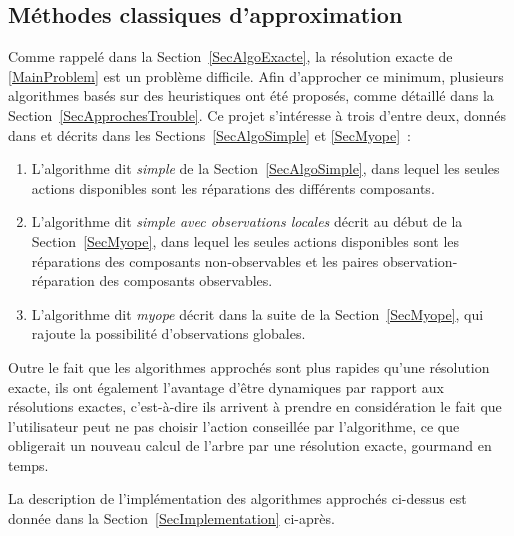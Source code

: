 \documentclass[a4paper,11pt]{article}
\theoremstyle{plain}
\theoremstyle{definition}
\begin{document}
\subsection{Méthodes classiques d'approximation}
\label{SecMethodesClassiques}

Comme rappelé dans la Section~\ref{SecAlgoExacte}, la résolution exacte de \eqref{MainProblem} est un problème difficile. Afin d'approcher ce minimum, plusieurs algorithmes basés sur des heuristiques ont été proposés, comme détaillé dans la Section~\ref{SecApprochesTrouble}. Ce projet s'intéresse à trois d'entre deux, donnés dans \cite{Heckerman_1995, heckerman1994troubleshooting} et décrits dans les Sections~\ref{SecAlgoSimple} et \ref{SecMyope}~:
\begin{enumerate}
\item L'algorithme dit \emph{simple} de la Section~\ref{SecAlgoSimple}, dans lequel les seules actions disponibles sont les réparations des différents composants.

\item L'algorithme dit \emph{simple avec observations locales} décrit au début de la Section~\ref{SecMyope}, dans lequel les seules actions disponibles sont les réparations des composants non-observables et les paires observation-réparation des composants observables.

\item L'algorithme dit \emph{myope} décrit dans la suite de la Section~\ref{SecMyope}, qui rajoute la possibilité d'observations globales.
\end{enumerate}
Outre le fait que les algorithmes approchés sont plus rapides qu'une résolution exacte, ils ont également l'avantage d'être dynamiques par rapport aux résolutions exactes, c'est-à-dire ils arrivent à prendre en considération le fait que l'utilisateur peut ne pas choisir l'action conseillée par l'algorithme, ce que obligerait un nouveau calcul de l'arbre par une résolution exacte, gourmand en temps.

La description de l'implémentation des algorithmes approchés ci-dessus est donnée dans la Section~\ref{SecImplementation} ci-après.

\end{document}

